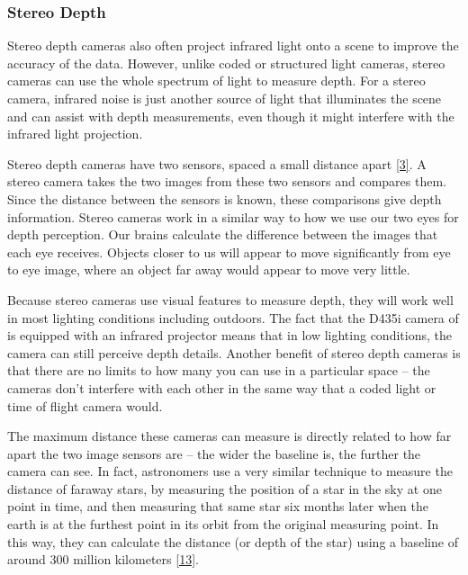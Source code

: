 \documentclass{article}
\begin{document}
\subsubsection{Stereo Depth}

Stereo depth cameras also often project infrared light onto a scene to improve the accuracy of the data. However, unlike coded or structured light cameras, stereo cameras can use the whole spectrum of light to measure depth. For a stereo camera, infrared noise is just another source of light that illuminates the scene and can assist with depth measurements, even though it might interfere with the infrared light projection.

Stereo depth cameras have two sensors, spaced a small distance apart \href{https://www.intelrealsense.com/beginners-guide-to-depth/}{[3]}. A stereo camera takes the two images from these two sensors and compares them. Since the distance between the sensors is known, these comparisons give depth information. Stereo cameras work in a similar way to how we use our two eyes for depth perception. Our brains calculate the difference between the images that each eye receives. Objects closer to us will appear to move significantly from eye to eye image, where an object far away would appear to move very little.

Because stereo cameras use visual features to measure depth, they will work well in most lighting conditions including outdoors. The fact that the D435i camera of is equipped with an infrared projector means that in low lighting conditions, the camera can still perceive depth details. Another benefit of stereo depth cameras is that there are no limits to how many you can use in a particular space – the cameras don’t interfere with each other in the same way that a coded light or time of flight camera would.

The maximum distance these cameras can measure is directly related to how far apart the two image sensors are – the wider the baseline is, the further the camera can see. In fact, astronomers use a very similar technique to measure the distance of faraway stars, by measuring the position of a star in the sky at one point in time, and then measuring that same star six months later when the earth is at the furthest point in its orbit from the original measuring point. In this way, they can calculate the distance (or depth of the star) using a baseline of around 300 million kilometers \href{https://courses.lumenlearning.com/astronomy/chapter/surveying-the-stars/}{[13]}.
\end{document}
